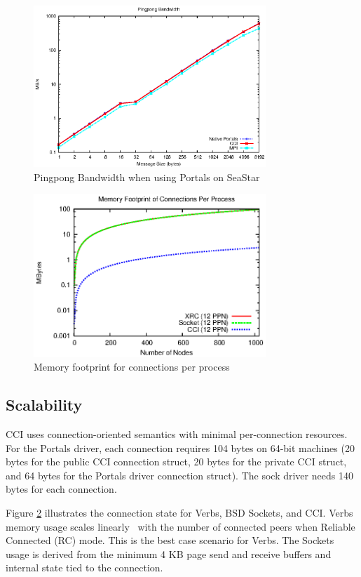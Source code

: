 \begin{figure}[htbp]
\centering
\includegraphics[width=3.45in]{pingpong-bw.eps}
\caption{Pingpong Bandwidth when using Portals on SeaStar}
\label{fig:bw}
\end{figure}

\begin{figure}[htbp]
\centering
\includegraphics[width=3.45in]{memory_log.eps}
\caption{Memory footprint for connections per process}
\label{fig:memory}
\end{figure}

\subsection{Scalability}
CCI uses connection-oriented semantics with minimal per-connection resources.
For the Portals driver, each connection requires 104 bytes on 64-bit machines
(20 bytes for the public CCI connection struct, 20 bytes for the private CCI
struct, and 64 bytes for the Portals driver connection struct).  The sock driver
needs 140 bytes for each connection.

Figure \ref{fig:memory} illustrates the connection state for
Verbs, BSD Sockets, and CCI. Verbs memory usage scales
linearly~\cite{Shipman:2008:XIS:1431669.1431683} with the number of
connected peers when Reliable Connected (RC) mode. This is
the best case scenario for Verbs. The Sockets usage is derived from
the minimum 4 KB page send and receive buffers and internal state tied
to the connection. 

